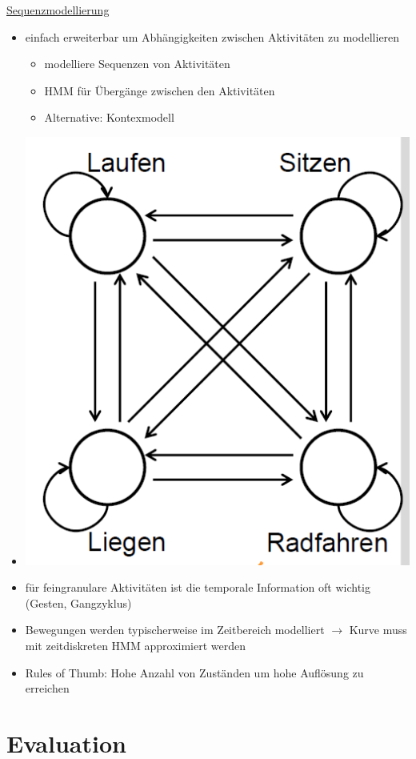 \documentclass[a4paper,10pt,oneside]{article}
\begin{document}
\underline{Sequenzmodellierung} \\
 	\begin{itemize}
 		\item einfach erweiterbar um Abhängigkeiten zwischen Aktivitäten zu modellieren
 			\begin{itemize}
 				\item modelliere Sequenzen von Aktivitäten
 				\item HMM für Übergänge zwischen den Aktivitäten
 				\item Alternative: Kontexmodell
 			\end{itemize}
 		\item[] \includegraphics[scale=0.2]{Grafiken/2334.png}
 		\item für feingranulare Aktivitäten ist die temporale Information oft wichtig (Gesten, Gangzyklus)
 		\item Bewegungen werden typischerweise im Zeitbereich modelliert $\rightarrow$ Kurve muss mit zeitdiskreten HMM approximiert werden
 		\item Rules of Thumb: Hohe Anzahl von Zuständen um hohe Auflösung zu erreichen
 	\end{itemize}

\section{Evaluation}
\end{document}
